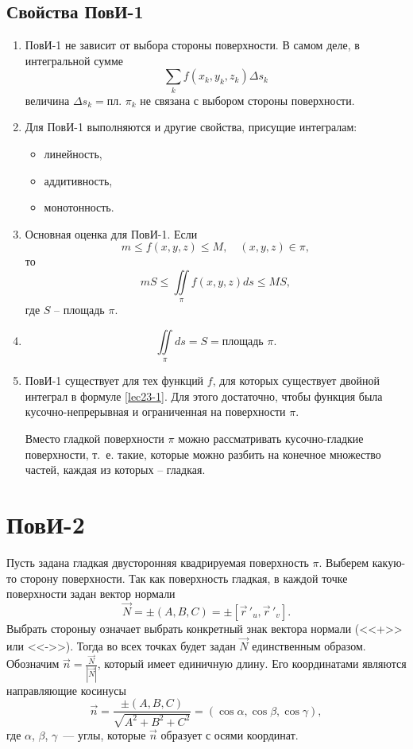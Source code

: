 \documentclass[../../main.tex]{subfiles}
\begin{document}
	\subsection{Свойства ПовИ-1}
	\begin{enumerate}[label=\arabic*$^{\circ}$]
		\item 	ПовИ-1 не зависит от выбора стороны поверхности. В самом деле, 
		в интегральной сумме \[\sum\limits_{k} f(x_k, y_k, z_k) \Delta s_k\]
		 величина $\Delta s_k = \text{пл. } \pi_k$ не связана с выбором стороны 
		 поверхности.
		 
		\item
		 Для ПовИ-1 выполняются и другие свойства, присущие интегралам:
		 \begin{itemize}
		  \item линейность,
		  \item аддитивность,
		  \item монотонность.
		 \end{itemize}

		\item Основная оценка для ПовИ-1. Если \[m \leq f(x, y, z) \leq M, \quad (x, 
		y, z) \in \pi,\]
		  то \[mS \leq \iint \limits_\pi f(x, y, z) ds \leq MS,\] где $S$ \---
		   площадь $\pi$.
		\item \[\iint \limits_\pi ds  = S = \text{площадь }\pi.\]
		\item ПовИ-1 существует для тех функций $f$, для которых существует двойной
		 интеграл в формуле \eqref{lec23-1}. Для этого достаточно, чтобы функция была
		  кусочно-непрерывная и ограниченная на поверхности $\pi$.
		
		Вместо гладкой поверхности $\pi$ можно рассматривать кусочно-гладкие
		 поверхности, т.~е. такие, которые можно разбить на конечное множество
		  частей, каждая из которых \--- гладкая.
		\end{enumerate}
		
		\section{ПовИ-2}
		Пусть задана гладкая двусторонняя квадрируемая поверхность $\pi$. Выберем
		 какую-то сторону поверхности. Так как поверхность гладкая, в каждой точке
		  поверхности задан вектор нормали \[\vec{N} = \pm (A, B,C) = \pm
		   [\vec r\,'_u, \vec r\,'_v].\] Выбрать стороныу означает выбрать конкретный
		    знак вектора нормали (<<+>> или <<->>). 
		    Тогда во всех точках будет задан $\vec{N}$
		     единственным образом. Обозначим $\vec{n} =
		      \frac{\vec{N}}{|\vec{N}|}$, который имеет
		       единичную длину. Его координатами являются
		       направляющие косинусы
		\[\vec{n} = \frac{\pm(A,B,C)}{\sqrt{A^2 +B^2 + C^2}} = 
		(\cos \alpha, \cos \beta, \cos \gamma),\]
		где $\alpha$, $\beta$, $\gamma$~--- углы, которые $\vec n$ образует с осями 
		координат.
\end{document}

